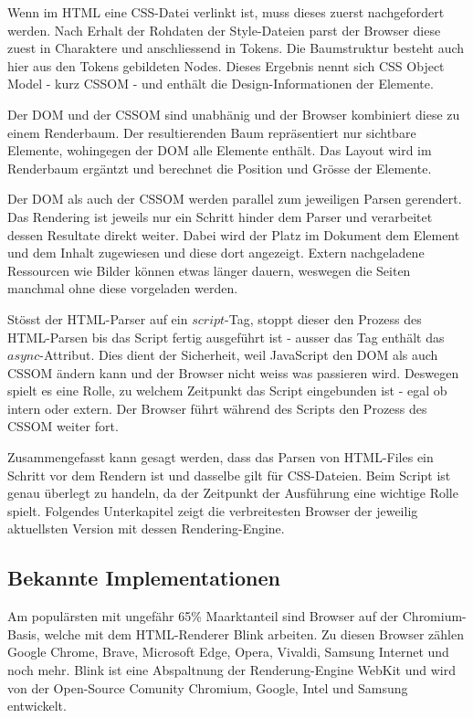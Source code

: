 Wenn im HTML eine CSS-Datei verlinkt ist, muss dieses zuerst nachgefordert werden.
Nach Erhalt der Rohdaten der Style-Dateien parst der Browser diese zuest in Charaktere und anschliessend in Tokens.
Die Baumstruktur besteht auch hier aus den Tokens gebildeten Nodes. 
Dieses Ergebnis nennt sich CSS Object Model - kurz CSSOM - und enthält die Design-Informationen der Elemente.

Der DOM und der CSSOM sind unabhänig und der Browser kombiniert diese zu einem Renderbaum.
Der resultierenden Baum repräsentiert nur sichtbare Elemente, wohingegen der DOM alle Elemente enthält.
Das Layout wird im Renderbaum ergäntzt und berechnet die Position und Grösse der Elemente.

Der DOM als auch der CSSOM werden parallel zum jeweiligen Parsen gerendert.
Das Rendering ist jeweils nur ein Schritt hinder dem Parser und verarbeitet dessen Resultate direkt weiter.
Dabei wird der Platz im Dokument dem Element und dem Inhalt zugewiesen und diese dort angezeigt.
Extern nachgeladene Ressourcen wie Bilder können etwas länger dauern, weswegen die Seiten manchmal ohne diese vorgeladen werden.

Stösst der HTML-Parser auf ein $script$-Tag, stoppt dieser den Prozess des HTML-Parsen bis das Script fertig ausgeführt ist - ausser das Tag enthält das $async$-Attribut.
Dies dient der Sicherheit, weil JavaScript den DOM als auch CSSOM ändern kann und der Browser nicht weiss was passieren wird.
Deswegen spielt es eine Rolle, zu welchem Zeitpunkt das Script eingebunden ist - egal ob intern oder extern. 
Der Browser führt während des Scripts den Prozess des CSSOM weiter fort.

Zusammengefasst kann gesagt werden, dass das Parsen von HTML-Files ein Schritt vor dem Rendern ist und dasselbe gilt für CSS-Dateien. 
Beim Script ist genau überlegt zu handeln, da der Zeitpunkt der Ausführung eine wichtige Rolle spielt.
Folgendes Unterkapitel zeigt die verbreitesten Browser der jeweilig aktuellsten Version mit dessen Rendering-Engine.


\subsection{Bekannte Implementationen}

Am populärsten mit ungefähr 65\% Maarktanteil sind Browser auf der Chromium-Basis, welche mit dem HTML-Renderer Blink arbeiten. 
Zu diesen Browser zählen Google Chrome, Brave, Microsoft Edge, Opera, Vivaldi, Samsung Internet und noch mehr.
Blink ist eine Abspaltnung der Renderung-Engine WebKit und wird von der Open-Source Comunity Chromium, Google, Intel und Samsung entwickelt.

